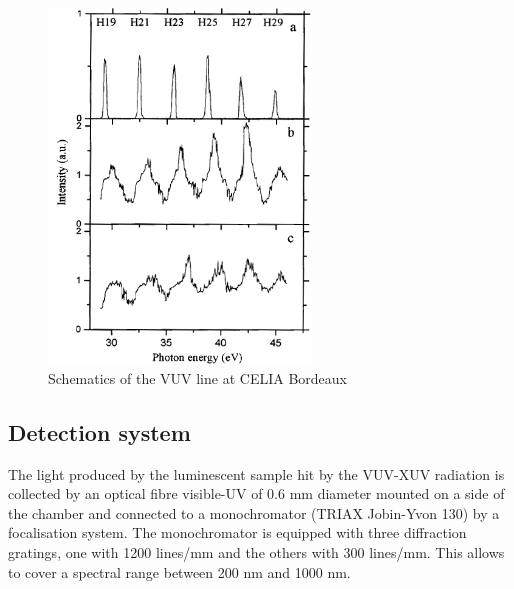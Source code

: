 \begin{figure}[htbp]
\begin{center}
\includegraphics[width=7cm]{../Pictures/Chapter_8/VUV_spectrum.png}
\end{center}
\caption[VUV spectrum]{Schematics of the VUV line at CELIA Bordeaux}
\label{fig:VUV_spectrum}
\end{figure}
\subsection{Detection system}
The light produced by the luminescent sample hit by the VUV-XUV radiation is collected by an optical fibre visible-UV of 0.6 mm diameter mounted on a side of the chamber and connected to a monochromator (TRIAX Jobin-Yvon 130) by a focalisation system.
The monochromator is equipped with three diffraction gratings, one with 1200 lines/mm and the others with 300 lines/mm. This allows to cover a spectral range between 200 nm and 1000 nm.

